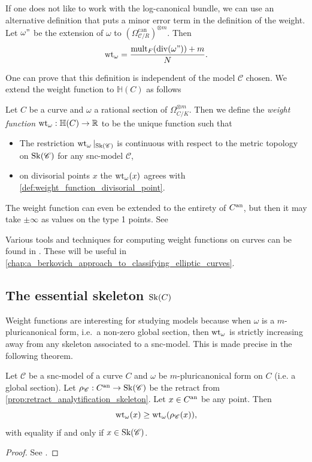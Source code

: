\begin{remark}
	If one does not like to work with the log-canonical bundle, we can use an alternative definition that puts a minor error term in the definition of the weight. 
	Let $\omega"$ be the extension of $\omega$ to $(\Omega_{\mathscr C / R}^{\text{can}})^{\otimes m}$. Then \[
		\operatorname{wt}_{\omega} = \frac{\operatorname{mult}_F(\operatorname{div} (\omega")) + m}{N}
	.\] 
\end{remark}
One can prove that this definition is independent of the model $\mathscr C$ chosen. 
We extend the weight function to $\mathbb{H}(C)$ as follows 
\begin{definition}\label{def:weight_function}
	Let $C$ be a curve and $\omega$ a rational section of $\Omega_{C / K}^{\otimes m}$. 
	Then we define the \emph{weight function} $\operatorname{wt}_{\omega}: \mathbb{H}(C) \to \mathbb{R}$ to be the unique function such that 
	\begin{itemize}
		\item The restriction $\operatorname{wt}_{\omega}|_{\operatorname{Sk}(\mathscr C)}$ is continuous with respect to the metric topology on $\operatorname{Sk}(\mathscr C)$ for any snc-model $\mathscr C$, 
		\item on divisorial points $x$ the $\operatorname{wt}_{\omega}(x)$ agrees with \cref{def:weight_function_divisorial_point}.
	\end{itemize}
\end{definition}

The weight function can even be extended to the entirety of $C{}^{\text{an}}$, but then it may take $\pm \infty$ as values on the type 1 points. See \cite[§4.5.4]{mustataWeightFunctionsNonArchimedean2015}


Various tools and techniques for computing weight functions on curves can be found in \cite{bakerWeightFunctionsBerkovich2016}. 
These will be useful in \cref{chap:a_berkovich_approach_to_classifying_elliptic_curves}. 

\subsection{The essential skeleton $\sk(C)$}\label{sec:the_essential_skeleton_sk_c$}

Weight functions are interesting for studying models because when $\omega$ is a $m$-pluricanonical form, i.e.\ a non-zero global section, then $\operatorname{wt}_\omega$ is strictly increasing away from any skeleton associated to a snc-model. 
This is made precise in the following theorem. 
\begin{proposition}\label{prop:weight_function_increase}
	Let $\mathscr C$ be a snc-model of a curve $C$ and $\omega$ be $m$-pluricanonical form on $C$ (i.e. a global section).
	Let $\rho_{\mathscr C}: C{}^{\text{an}} \to \operatorname{Sk}(\mathscr C)$ be the retract from \cref{prop:retract_analytification_skeleton}. 
	Let $x \in C{}^{\text{an}} $ be any point. 
	Then \[
		\operatorname{wt}_\omega(x) \ge \operatorname{wt}_\omega(\rho_{\mathscr C}(x))
	,\] 
	with equality if and only if $x \in \operatorname{Sk}(\mathscr C)$. 
\end{proposition}
\begin{proof}
	See \cite[prop.\ 4.4.4]{mustataWeightFunctionsNonArchimedean2015}. 
\end{proof}

